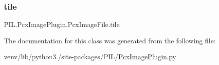 \mbox{\label{classPIL_1_1PcxImagePlugin_1_1PcxImageFile_a58fd7b018f660a67999f8df20586b961}} 
\subsubsection{\texorpdfstring{tile}{tile}}
{\footnotesize\ttfamily P\+I\+L.\+Pcx\+Image\+Plugin.\+Pcx\+Image\+File.\+tile}



The documentation for this class was generated from the following file\+:\begin{DoxyCompactItemize}
\item 
venv/lib/python3./site-\/packages/\+P\+I\+L/\hyperlink{PcxImagePlugin_8py}{Pcx\+Image\+Plugin.\+py}\end{DoxyCompactItemize}
